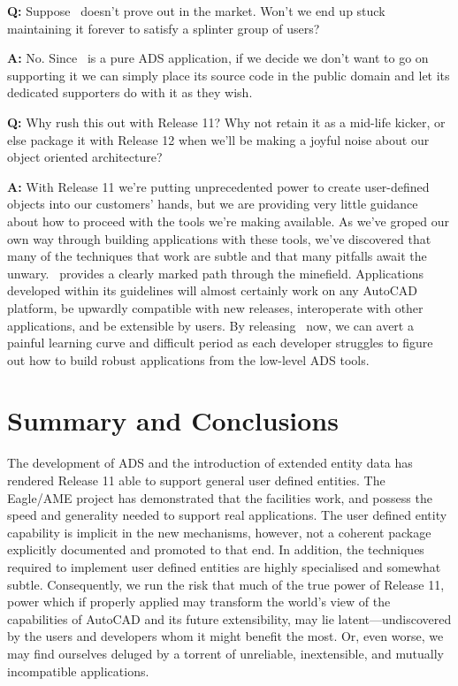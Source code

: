 \documentclass{article}
\begin{document}
{\bf Q:}  Suppose \cw\ doesn't prove out in the market.  Won't we end
up stuck maintaining it forever to satisfy a splinter group of users?

{\bf A:}  No.  Since \cw\ is a pure ADS application, if we decide we
don't want to go on supporting it we can simply place its source code
in the public domain and let its dedicated supporters do with it as
they wish.

{\bf Q:}  Why rush this out with Release 11?  Why not retain it as a
mid-life kicker, or else package it with Release 12 when we'll be
making a joyful noise about our object oriented architecture?

{\bf A:}  With Release 11 we're putting unprecedented power to create
user-defined objects into our customers' hands, but we are providing very
little guidance about how to proceed with the tools we're making
available.  As we've groped our own way through building
applications with these tools, we've discovered that many of the techniques
that work are subtle and that many pitfalls await the unwary.  \cw\
provides a clearly marked path through the minefield.  Applications
developed within its guidelines will almost certainly work on any
AutoCAD platform, be upwardly compatible with new releases,
interoperate with other applications, and be extensible by users.  By
releasing \cw\ now, we can avert a painful learning curve and
difficult period as each developer struggles to figure out how to
build robust applications from the low-level ADS tools.

\section{Summary and Conclusions}

The development of ADS and the introduction of extended entity data
has rendered Release 11 able to support general user defined entities.
The Eagle/AME project has demonstrated that the facilities work, and
possess the speed and generality needed to support real applications.
The user defined entity capability is implicit in the new mechanisms,
however, not a coherent package explicitly documented and promoted to
that end.  In addition, the techniques required to implement user
defined entities are highly specialised and somewhat subtle.  Consequently, we
run the risk that much of the true power of Release 11, power which if
properly applied may transform the world's view of the capabilities of
AutoCAD and its future extensibility, may lie latent---undiscovered by
the users and developers whom it might benefit the most.  Or, even
worse, we may find ourselves deluged by a torrent of unreliable,
inextensible, and mutually incompatible applications.
\end{document}
